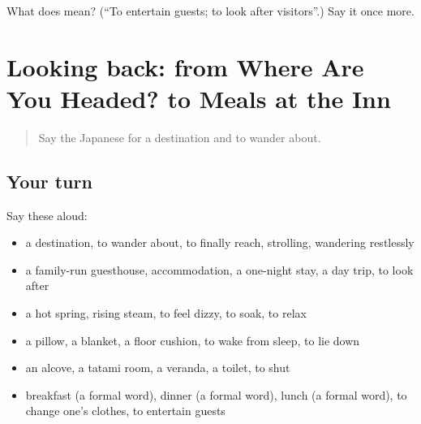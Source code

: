 \begin{tcolorbox}[breakable,colback=teal!4,colframe=teal!35!black,title={Before you move on}]
What does  mean? (\textquotedblleft{}To entertain guests; to look after visitors\textquotedblright{}.) Say it once more.
\end{tcolorbox}
\section[(dialogue)]{Looking back: from Where Are You Headed? to Meals at the Inn}

\label{lesson:JA-R401-review-396-401}



\begin{quote}
Say the Japanese for a destination and to wander about.
\end{quote}

\subsection*{Your turn}
Say these aloud:

\begin{itemize}
\raggedright
  \item a destination, to wander about, to finally reach, strolling, wandering restlessly
  \item a family-run guesthouse, accommodation, a one-night stay, a day trip, to look after
  \item a hot spring, rising steam, to feel dizzy, to soak, to relax
  \item a pillow, a blanket, a floor cushion, to wake from sleep, to lie down
  \item an alcove, a tatami room, a veranda, a toilet, to shut
  \item breakfast (a formal word), dinner (a formal word), lunch (a formal word), to change one's clothes, to entertain guests
\end{itemize}

